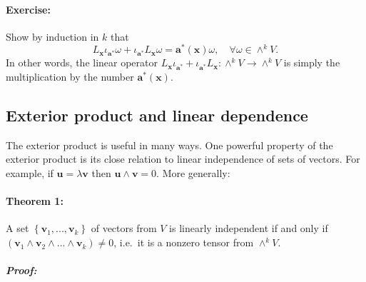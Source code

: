 \paragraph{Exercise:}

Show by induction in $k$ that\[
L_{\mathbf{x}}\iota_{\mathbf{a}^{*}}\omega+\iota_{\mathbf{a}^{*}}L_{\mathbf{x}}\omega=\mathbf{a}^{*}(\mathbf{x})\omega,\quad\forall\omega\in\wedge^{k}V.\]
In other words, the linear operator $L_{\mathbf{x}}\iota_{\mathbf{a}^{*}}+\iota_{\mathbf{a}^{*}}L_{\mathbf{x}}:\wedge^{k}V\rightarrow\wedge^{k}V$
is simply the multiplication by the number $\mathbf{a}^{*}(\mathbf{x})$.


\paragraph{}


\subsection{Exterior product and linear dependence\label{sub:Properties-of-the-ext-powers}}

The exterior product is useful in many ways. One powerful property
of the exterior product is its close relation to linear independence
of sets of vectors. For example, if $\mathbf{u}=\lambda\mathbf{v}$
then $\mathbf{u}\wedge\mathbf{v}=0$. More generally:


\paragraph{Theorem 1:}

A set $\left\{ \mathbf{v}_{1},...,\mathbf{v}_{k}\right\} $ of vectors
from $V$ is linearly independent if and only if $(\mathbf{v}_{1}\wedge\mathbf{v}_{2}\wedge...\wedge\mathbf{v}_{k})\neq0$,
i.e.~it is a nonzero tensor from $\wedge^{k}V$.


\subparagraph{Proof:}

